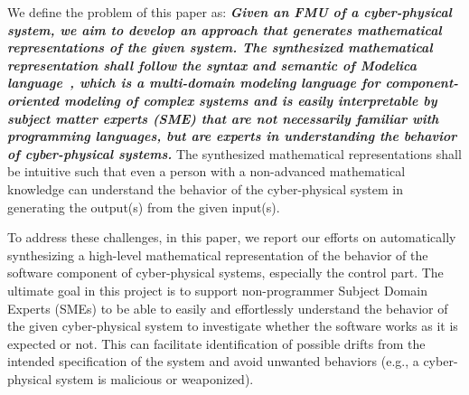 We define the problem of this paper as: \textbf{\textit{Given an FMU of a cyber-physical system, we aim to develop an approach that generates mathematical representations of the given system. The synthesized mathematical representation shall follow the syntax and semantic of Modelica language~\citeme{}, which is a multi-domain modeling language for component-oriented modeling of complex systems and is easily interpretable by subject matter experts (SME) that are not necessarily familiar with programming languages, but are experts in understanding the behavior of cyber-physical systems.}} The synthesized mathematical representations shall be intuitive such that even a person with a non-advanced mathematical knowledge can understand the behavior of the cyber-physical system in generating the output(s) from the given input(s).

To address these challenges, in this paper, we report our efforts on automatically synthesizing a high-level mathematical representation of the behavior of the software component of cyber-physical systems, especially the control part. The ultimate goal in this project is to support non-programmer Subject Domain Experts (SMEs) to be able to easily and effortlessly understand the behavior of the given cyber-physical system to investigate whether the software works as it is expected or not. This can facilitate identification of possible drifts from the intended specification of the system and avoid unwanted behaviors (e.g., a cyber-physical system is malicious or weaponized). 


